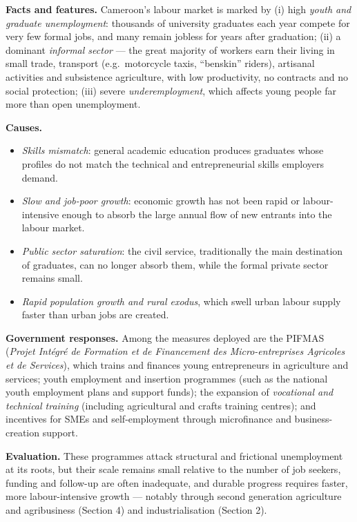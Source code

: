 \documentclass[11pt]{article}
\newcommand{\cle}[1]{{\popxbold\color{popdark}#1}}
\begin{document}
\begin{experience}
\textbf{Facts and features.} Cameroon's labour market is marked by (i) high \emph{youth and graduate unemployment}: thousands of university graduates each year compete for very few formal jobs, and many remain jobless for years after graduation; (ii) a dominant \emph{informal sector} — the great majority of workers earn their living in small trade, transport (e.g.\ motorcycle taxis, ``benskin'' riders), artisanal activities and subsistence agriculture, with low productivity, no contracts and no social protection; (iii) severe \emph{underemployment}, which affects young people far more than open unemployment.
\par\smallskip
\textbf{Causes.}
\begin{itemize}
\item \emph{Skills mismatch}: general academic education produces graduates whose profiles do not match the technical and entrepreneurial skills employers demand.
\item \emph{Slow and job-poor growth}: economic growth has not been rapid or labour-intensive enough to absorb the large annual flow of new entrants into the labour market.
\item \emph{Public sector saturation}: the civil service, traditionally the main destination of graduates, can no longer absorb them, while the formal private sector remains small.
\item \emph{Rapid population growth and rural exodus}, which swell urban labour supply faster than urban jobs are created.
\end{itemize}
\par\smallskip
\textbf{Government responses.} Among the measures deployed are the \cle{PIFMAS} (\emph{Projet Intégré de Formation et de Financement des Micro-entreprises Agricoles et de Services}), which trains and finances young entrepreneurs in agriculture and services; youth employment and insertion programmes (such as the national youth employment plans and support funds); the expansion of \emph{vocational and technical training} (including agricultural and crafts training centres); and incentives for SMEs and self-employment through microfinance and business-creation support.
\par\smallskip
\textbf{Evaluation.} These programmes attack structural and frictional unemployment at its roots, but their scale remains small relative to the number of job seekers, funding and follow-up are often inadequate, and durable progress requires faster, more labour-intensive growth — notably through second generation agriculture and agribusiness (Section 4) and industrialisation (Section 2).
\end{experience}
\end{document}
